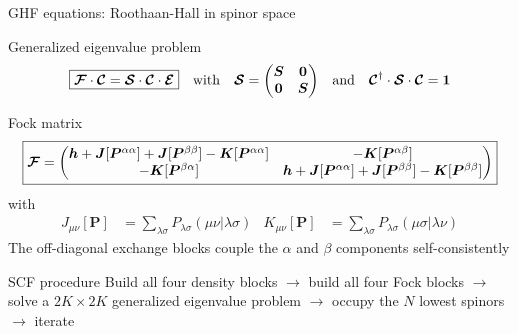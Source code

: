 \documentclass[aspectratio=169,9pt]{beamer}
\newcommand{\bh}{\boldsymbol{h}}
\newcommand{\bJ}{\boldsymbol{J}}
\newcommand{\bK}{\boldsymbol{K}}
\newcommand{\bP}{\boldsymbol{P}}
\newcommand{\bI}{\boldsymbol{1}}
\newcommand{\bO}{\boldsymbol{0}}
\newcommand{\bS}{\boldsymbol{S}}
\newcommand{\rbraket}[2]{( #1 | #2 )}
\begin{document}
\begin{frame}{GHF equations: Roothaan-Hall in spinor space}
	\begin{block}{Generalized eigenvalue problem}
    	\begin{equation*}
    		\boxed{\boldsymbol{\mathcal{F}} \cdot \boldsymbol{\mathcal{C}} = \boldsymbol{\mathcal{S}} \cdot \boldsymbol{\mathcal{C}} \cdot \boldsymbol{\mathcal{E}}}
    		\qq{with}
    		\boldsymbol{\mathcal{S}}=\mqty(\bS&\bO\\\bO&\bS)
    		\qand
    		\boldsymbol{\mathcal{C}}^\dagger \cdot \boldsymbol{\mathcal{S}} \cdot \boldsymbol{\mathcal{C}} = \bI
    	\end{equation*}
	\end{block}

	\begin{block}{Fock matrix}
    	\begin{equation*}
    		\boxed{
    		\boldsymbol{\mathcal{F}} =
    		\mqty(
    		\bh + \bJ[\bP^{\alpha\alpha}] + \bJ[\bP^{\beta\beta}] - \bK[\bP^{\alpha\alpha}]
    		& 
    		- \bK[\bP^{\alpha\beta}]
    		\\
    		- \bK[\bP^{\beta\alpha}]
    		& 
    		\bh + \bJ[\bP^{\alpha\alpha}] + \bJ[\bP^{\beta\beta}] -\bK[\bP^{\beta\beta}]
    		)
    		}
    	\end{equation*}
    	with 
    	\begin{align*}
    		J_{\mu\nu}[\bP]
    		&=\sum_{\lambda\sigma}P_{\lambda\sigma}\rbraket{\mu\nu}{\lambda\sigma}
    		&
    		K_{\mu\nu}[\bP]
    		&=\sum_{\lambda\sigma}P_{\lambda\sigma}\rbraket{\mu\sigma}{\lambda\nu}
    	\end{align*}
    	\alert{The off-diagonal exchange blocks couple the $\alpha$ and $\beta$ components self-consistently}
	\end{block}

	\begin{block}{SCF procedure}
		Build all four density blocks $\rightarrow$ build all four Fock blocks
		$\rightarrow$ solve a $2K\times2K$ generalized eigenvalue problem
		$\rightarrow$ occupy the $N$ lowest spinors $\rightarrow$ iterate
	\end{block}

\end{frame}
\end{document}
